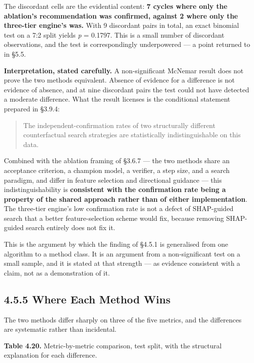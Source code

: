 The discordant cells are the evidential content: \textbf{7 cycles where only the ablation's recommendation was confirmed, against 2 where only the three-tier engine's was.} With 9 discordant pairs in total, an exact binomial test on a 7:2 split yields \emph{p} = 0.1797. This is a small number of discordant observations, and the test is correspondingly underpowered --- a point returned to in §5.5.

\textbf{Interpretation, stated carefully.} A non-significant McNemar result does not prove the two methods equivalent. Absence of evidence for a difference is not evidence of absence, and at nine discordant pairs the test could not have detected a moderate difference. What the result licenses is the conditional statement prepared in §3.9.4:

\begin{quote}
The independent-confirmation rates of two structurally different counterfactual search strategies are statistically indistinguishable on this data.
\end{quote}

Combined with the ablation framing of §3.6.7 --- the two methods share an acceptance criterion, a champion model, a verifier, a step size, and a search paradigm, and differ in feature selection and directional guidance --- this indistinguishability is \textbf{consistent with the confirmation rate being a property of the shared approach rather than of either implementation}. The three-tier engine's low confirmation rate is not a defect of SHAP-guided search that a better feature-selection scheme would fix, because removing SHAP-guided search entirely does not fix it.

This is the argument by which the finding of §4.5.1 is generalised from one algorithm to a method class. It is an argument from a non-significant test on a small sample, and it is stated at that strength --- as evidence consistent with a claim, not as a demonstration of it.

\hypertarget{where-each-method-wins}{%
\subsection{4.5.5 Where Each Method Wins}\label{where-each-method-wins}}

The two methods differ sharply on three of the five metrics, and the differences are systematic rather than incidental.

\textbf{Table 4.20.} Metric-by-metric comparison, test split, with the structural explanation for each difference.


